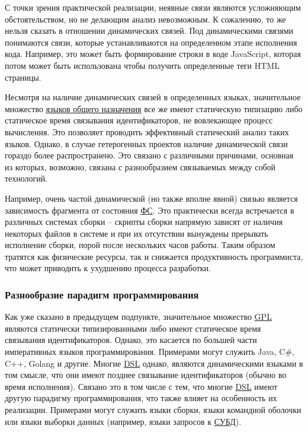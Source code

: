С точки зрения практической реализации, неявные связи являются усложняющим обстоятельством, но не
делающим анализ невозможным. К сожалению, то же нельзя сказать в отношении динамических связей. Под
динамическими связями понимаются связи, которые устанавливаются на определенном этапе исполнения кода.
Например, это может быть формирование строки в коде JavaScript, которая потом может быть использована чтобы
получить определенные теги HTML страницы.

Несмотря на наличие динамических связей в определенных языках, значительное множество \hyperlink{GPL}{языков общего назначения}
все же имеют статическую типизацию либо статическое время связывания идентификаторов, не вовлекающее процесс вычисления.
Это позволяет проводить эффективный статический анализ таких языков. Однако, в случае гетерогенных проектов наличие динамической
связи гораздо более распространено. Это связано с различными причинами, основная из которых, возможно,
связана с разнообразием связываемых между собой технологий. 

Например, очень частой динамической (но также вполне явной) связью является зависимость фрагмента от состояния \hyperlink{ФС}{ФС}. Это практически всегда встречается
в различных системах сборки -- скрипты сборки напрямую зависят от наличия некоторых файлов в системе и
при их отсутствии вынуждены прерывать исполнение сборки, порой после нескольких часов работы. Таким образом
тратятся как физические ресурсы, так и снижается продуктивность программиста, что может приводить к
ухудшению процесса разработки.

\subsubsection{Разнообразие парадигм программирования}

Как уже сказано в предыдущем подпункте, значительное множество \hyperlink{GPL}{GPL} являются статически типизированными
либо имеют статическое время связывания идентификаторов. Однако, это касается по большей части
императивных языков программирования. Примерами могут служить Java, C\#, C++, Golang и другие.
Многие \hyperlink{DSL}{DSL} однако, являются динамическими языками в том смысле, что они имеют позднее
связывание идентификаторов (обычно во время исполнения). Связано это в том числе с тем, что многие \hyperlink{DSL}{DSL}
имеют другую парадигму программирования, что также влияет на особенность их реализации. Примерами могут служить 
языки сборки, языки командной оболочки или языки выборки данных (например, языки запросов к \hyperlink{СУБД}{СУБД}).

